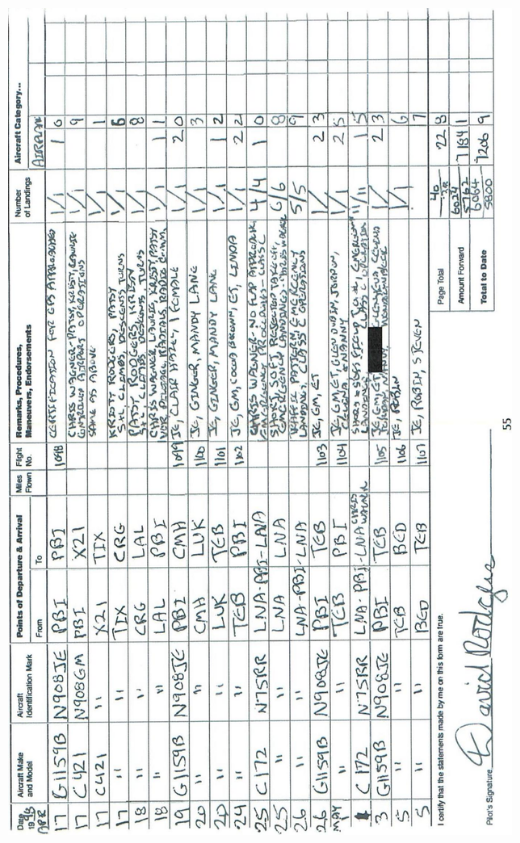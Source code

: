 \documentclass[10pt]{article}
\begin{document}
\includegraphics[max width=\textwidth, center]{2025_02_27_dd68c3d38de88f0516d9g-059}\\
\end{document}
